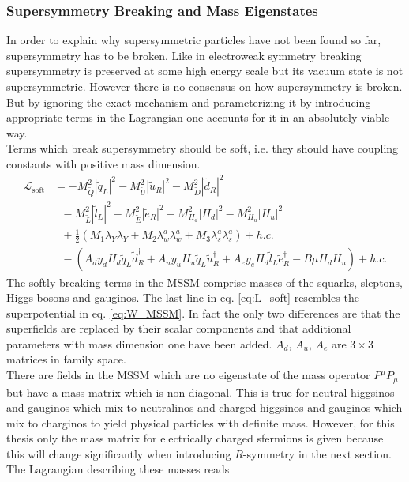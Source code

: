 \subsubsection{Supersymmetry Breaking and Mass Eigenstates}\label{sec:SUSYBreaking}
In order to explain why supersymmetric particles have not been found so far, supersymmetry has to be broken. Like in electroweak symmetry breaking supersymmetry is preserved at some high energy scale but its vacuum state is not supersymmetric. However there is no consensus on how supersymmetry is broken. But by ignoring the exact mechanism and parameterizing it by introducing appropriate terms in the Lagrangian one accounts for it in an absolutely viable way.\\
Terms which break supersymmetry should be soft, i.e. they should have coupling constants with positive mass dimension.
\begin{align}
\mathcal{L}_{\mathrm{soft}} &= -M^2_{\tilde{Q}}|\tilde{q}_L|^2 - M^2_{\tilde{U}}|\tilde{u}_R|^2 - M^2_{\tilde{D}}|\tilde{d}_R|^2 \nonumber\\
&\ \ \ - M^2_{\tilde{L}}|\tilde{l}_L|^2 - M^2_{\tilde{E}}|\tilde{e}_R|^2 - M^2_{H_d}|H_d|^2 - M^2_{H_u}|H_u|^2\nonumber\\
&\ \ \ +\frac{1}{2}\left( M_1 \lambda_Y\lambda_Y + M_2 \lambda_w^a\lambda_w^a + M_3 \lambda_s^a\lambda_s^a\right) + h.c.\nonumber\\
&\ \ \ -\left( A_d y_d H_d \tilde{q}_L \tilde{d}^\dagger_R + A_u y_u H_u \tilde{q}_L \tilde{u}^\dagger_R + A_e y_e H_d \tilde{l}_L \tilde{e}^\dagger_R -B\mu H_d H_u \right) + h.c.\label{eq:L_soft}
\end{align}
The softly breaking terms in the MSSM comprise masses of the squarks, sleptons, Higgs-bosons and gauginos. The last line in eq. \eqref{eq:L_soft} resembles the superpotential in eq. \eqref{eq:W_MSSM}. In fact the only two differences are that the superfields are replaced by their scalar components and that additional parameters with mass dimension one have been added. $A_d$, $A_u$, $A_e$ are $3 \times 3$ matrices in family space.\\
There are fields in the MSSM which are no eigenstate of the mass operator $P^\mu P_\mu$ but have a mass matrix which is non-diagonal. This is true for neutral higgsinos and gauginos which mix to neutralinos and charged higgsinos and gauginos which mix to charginos to yield physical particles with definite mass. However, for this thesis only the mass matrix for electrically charged sfermions is given because this will change significantly when introducing $R$-symmetry in the next section. The Lagrangian describing these masses reads
